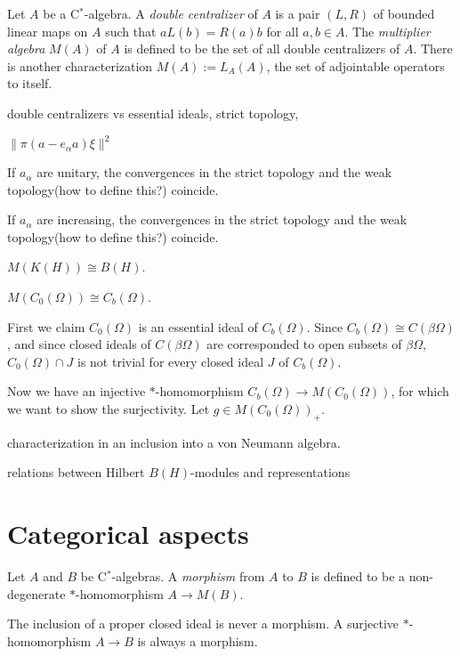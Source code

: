 \documentclass{../../large}
\begin{document}
\begin{prb}
Let $A$ be a C$^*$-algebra.
A \emph{double centralizer} of $A$ is a pair $(L,R)$ of bounded linear maps on $A$ such that $aL(b)=R(a)b$ for all $a,b\in A$.
The \emph{multiplier algebra} $M(A)$ of $A$ is defined to be the set of all double centralizers of $A$.
There is another characterization $M(A):=L_A(A)$, the set of adjointable operators to itself.

double centralizers vs essential ideals,
strict topology, 
\begin{parts}
\item $\|\pi(a-e_\alpha a)\xi\|^2$
\item If $a_\alpha$ are unitary, the convergences in the strict topology and the weak topology(how to define this?) coincide.
\item If $a_\alpha$ are increasing, the convergences in the strict topology and the weak topology(how to define this?) coincide.
\item $M(K(H))\cong B(H)$.
\item $M(C_0(\Omega))\cong C_b(\Omega)$.
\end{parts}
\end{prb}
\begin{pf}
First we claim $C_0(\Omega)$ is an essential ideal of $C_b(\Omega)$.
Since $C_b(\Omega)\cong C(\beta\Omega)$, and since closed ideals of $C(\beta\Omega)$ are corresponded to open subsets of $\beta\Omega$, $C_0(\Omega)\cap J$ is not trivial for every closed ideal $J$ of $C_b(\Omega)$.

Now we have an injective $*$-homomorphism $C_b(\Omega)\to M(C_0(\Omega))$, for which we want to show the surjectivity.
Let $g\in M(C_0(\Omega))_+$.
\end{pf}

characterization in an inclusion into a von Neumann algebra.

relations between Hilbert $B(H)$-modules and representations


\section{Categorical aspects}

\begin{prb}[Morphisms]
Let $A$ and $B$ be C$^*$-algebras.
A \emph{morphism} from $A$ to $B$ is defined to be a non-degenerate $*$-homomorphism $A\to M(B)$.
\begin{parts}
\item The inclusion of a proper closed ideal is never a morphism. A surjective $*$-homomorphism $A\to B$ is always a morphism.
\end{parts}
\end{prb}
\end{document}
